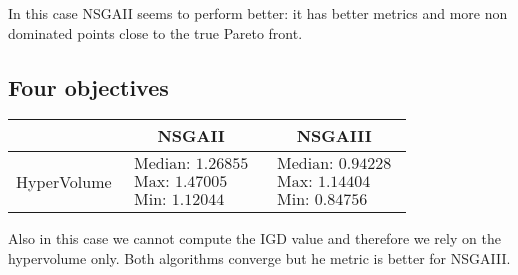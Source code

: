 \documentclass[a4paper,11pt]{article}
\numberwithin{equation}{section}
\begin{document}
\noindent In this case NSGAII seems to perform better: it has better metrics and more non dominated points close to the true Pareto front.

\subsection{Four objectives}

\begin{table}[!h]
\begin{center}
\begin{tabular}{|c|c|c|}
\hline
 & NSGAII & NSGAIII \\
\hline
HyperVolume &$\begin{array}{l}
\text{Median: 1.26855}\\
\text{Max: 1.47005}\\
\text{Min: 1.12044}\end{array}$&
$\begin{array}{l}
\text{Median: 0.94228}\\
\text{Max: 1.14404}\\
\text{Min: 0.84756}\end{array}$\\
\hline
\end{tabular}
\end{center}
\end{table}

\noindent Also in this case we cannot compute the IGD value and therefore we rely on the hypervolume only. Both algorithms converge but he metric is better for NSGAIII.
\end{document}
